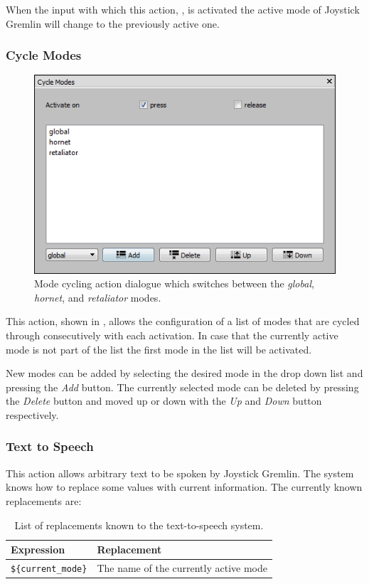 \documentclass[a4, 10pt]{article}
\newcommand{\JG}{Joystick Gremlin}
\begin{document}
When the input with which this action, , is
activated the active mode of \JG{} will change to the previously active
one.


\subsubsection{Cycle Modes}

\begin{figure}[bt]
    \centering

    \includegraphics[width=0.75\linewidth]{images/action_cycle_modes}
    \caption{Mode cycling action dialogue which switches between the
        \emph{global}, \emph{hornet}, and \emph{retaliator} modes.}
    \label{fig:action_cycle_modes}
\end{figure}

This action, shown in , allows the
configuration of a list of modes that are cycled through consecutively
with each activation. In case that the currently active mode is not part
of the list the first mode in the list will be activated.

New modes can be added by selecting the desired mode in the drop down
list and pressing the \emph{Add} button. The currently selected mode can
be deleted by pressing the \emph{Delete} button and moved up or down
with the \emph{Up} and \emph{Down} button respectively.


\subsubsection{Text to Speech}

This action allows arbitrary text to be spoken by \JG{}. The system
knows how to replace some values with current information. The currently
known replacements are:

\begin{table}[h]
    \centering

    \begin{tabular}{ll}
        \toprule
        Expression & Replacement \\
        \midrule
        \verb+${current_mode}+ & The name of the currently active mode \\
        \bottomrule
    \end{tabular}

    \caption{List of replacements known to the text-to-speech system.}
\end{table}
\end{document}
